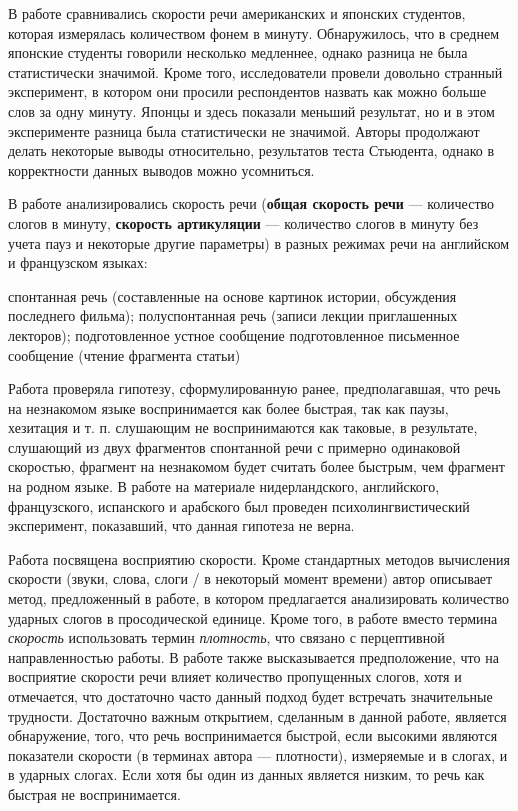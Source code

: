 \par В работе \citep{osser64}  сравнивались скорости речи американских и японских студентов, которая измерялась количеством фонем в минуту. Обнаружилось, что в среднем японские студенты говорили несколько медленнее, однако разница не была статистически значимой. Кроме того, исследователи провели довольно странный эксперимент, в котором они просили респондентов назвать как можно больше слов за одну минуту. Японцы и здесь показали меньший результат, но и в этом эксперименте разница была статистически не значимой. Авторы продолжают делать некоторые выводы относительно, результатов теста Стьюдента, однако в корректности данных выводов можно усомниться.
\par В работе \citep{barik77} анализировались скорость речи (\textbf{общая скорость речи} --- количество слогов в минуту, \textbf{скорость артикуляции} --- количество слогов в минуту без учета пауз и некоторые другие параметры) в разных режимах речи на английском и французском языках:
\begin{itemize}
\mytem спонтанная речь (составленные на основе картинок истории, обсуждения последнего фильма);
\mytem полуспонтанная речь (записи лекции приглашенных лекторов);
\mytem подготовленное устное сообщение 
\mytem подготовленное письменное сообщение (чтение фрагмента статьи)
\end{itemize}
\par Работа \citep{vaane82} проверяла гипотезу, сформулированную ранее, предполагавшая, что речь на незнакомом языке воспринимается как более быстрая, так как паузы, хезитация и т. п. слушающим не воспринимаются как таковые, в результате, слушающий из двух фрагментов спонтанной речи с примерно одинаковой скоростью, фрагмент на незнакомом будет считать более быстрым, чем фрагмент на родном языке. В работе \citep{vaane82} на материале нидерландского, английского, французского, испанского и арабского был проведен психолингвистический эксперимент, показавший, что данная гипотеза не верна.
\par Работа \citep{uhmann92} посвящена восприятию скорости. Кроме стандартных методов вычисления скорости (звуки, слова, слоги / в некоторый момент времени) автор описывает метод, предложенный в работе, в котором предлагается анализировать количество ударных слогов в просодической единице. Кроме того, в работе вместо термина \textit{скорость} использовать термин \textit{плотность}, что связано с перцептивной направленностью работы. В работе также высказывается предположение, что на восприятие скорости речи влияет количество пропущенных слогов, хотя и отмечается, что достаточно часто данный подход будет встречать значительные трудности. Достаточно важным открытием, сделанным в данной работе, является обнаружение, того, что речь воспринимается быстрой, если высокими являются показатели скорости (в терминах автора --- плотности), измеряемые и в слогах, и в ударных слогах. Если хотя бы один из данных является низким, то речь как быстрая не воспринимается.
